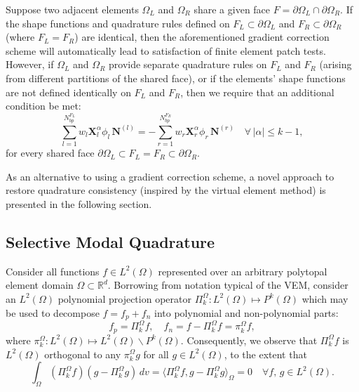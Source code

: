     	Suppose two adjacent elements $\Omega_{L}$ and $\Omega_{R}$ share a given face $F = \partial \Omega_{L} \cap \partial \Omega_{R}$. If the shape functions and quadrature rules defined on $F_L \subset \partial \Omega_L$ and $F_R \subset \partial \Omega_R$ (where $F_L = F_R$) are identical, then the aforementioned gradient correction scheme will automatically lead to satisfaction of finite element patch tests. However, if $\Omega_{L}$ and $\Omega_{R}$ provide separate quadrature rules on $F_L$ and $F_R$ (arising from different partitions of the shared face), or if the elements' shape functions are not defined identically on $F_L$ and $F_R$, then we require that an additional condition be met:
    	\begin{equation}
    		\sum_{l=1}^{N^{F_L}_{bp}} w_l \mathbf{X}^{\alpha}_l \phi_l \, \mathbf{N}^{(l)} = - \sum_{r=1}^{N^{F_R}_{bp}} w_r \mathbf{X}^{\alpha}_r \phi_r \, \mathbf{N}^{(r)} \quad \forall \, | \alpha | \leq k-1,
    		\label{eq:face_constraint}
    	\end{equation}
    	for every shared face $\partial \Omega_L \subset F_L = F_R \subset \partial \Omega_R$.
		
	 As an alternative to using a gradient correction scheme, a novel approach to restore quadrature consistency (inspired by the virtual element method) is presented in the following section.
		
	\subsection*{Selective Modal Quadrature}
	
	Consider all functions $f \in L^2 (\Omega)$ represented over an arbitrary polytopal element domain $\Omega \subset \mathbb{R}^d$. Borrowing from notation typical of the VEM, consider an $L^2 (\Omega)$ polynomial projection operator $\Pi^{\Omega}_k : L^2 (\Omega) \mapsto P^k (\Omega)$ which may be used to decompose $f = f_p + f_n$ into polynomial and non-polynomial parts:
	\begin{equation}
		f_p = \Pi^{\Omega}_k f, \quad f_n = f - \Pi^{\Omega}_k f = \pi^{\Omega}_k f,
	\end{equation}
	where $\pi^{\Omega}_k : L^2 (\Omega) \mapsto L^2 (\Omega) \backslash P^k (\Omega)$. Consequently, we observe that $\Pi^{\Omega}_k f$ is $L^2 (\Omega)$ orthogonal to any $\pi^{\Omega}_k g$ for all $g \in L^2 (\Omega)$, to the extent that
	\begin{equation}
		\int_{\Omega} (\Pi^{\Omega}_k f) (g - \Pi^{\Omega}_k g) \, dv = \langle \Pi^{\Omega}_k f, g - \Pi^{\Omega}_k g \rangle_{\Omega} = 0 \quad \forall f, \, g \in L^2 (\Omega).
	\end{equation}
	
